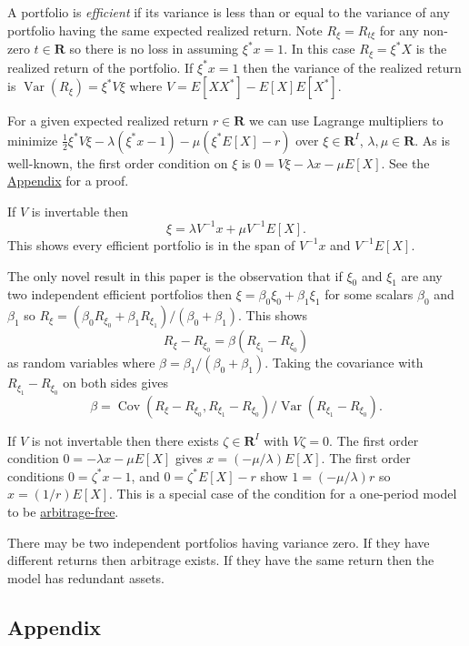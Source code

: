 A portfolio is \emph{efficient} if its variance is less than or equal to
the variance of any portfolio having the same expected realized return.
Note \(R_\xi = R_{t\xi}\) for any non-zero \(t\in\mathbf{R}\) so there
is no loss in assuming \(\xi^* x = 1\). In this case \(R_\xi = \xi^* X\)
is the realized return of the portfolio. If \(\xi^* x = 1\) then the
variance of the realized return is
\(\operatorname{Var}(R_\xi) = \xi^*V\xi\) where \({V = E[X X^*] -
E[X] E[X^*]}\).

For a given expected realized return \(r\in\mathbf{R}\) we can use
Lagrange multipliers to minimize
\({\frac{1}{2}\xi^* V\xi - \lambda(\xi^* x - 1) - \mu(\xi^* E[X] - r)}\)
over \(\xi\in\mathbf{R}^I\), \({\lambda, \mu\in\mathbf{R}}\). As is
well-known, the first order condition on \(\xi\) is
\({0 = V\xi - \lambda x - \mu E[X]}\). See the
\hyperref[appendix]{Appendix} for a proof.

If \(V\) is invertable then \[
    \xi =  \lambda V^{-1}x + \mu V^{-1} E[X].
\] This shows every efficient portfolio is in the span of \(V^{-1}x\)
and \(V^{-1} E[X]\).

The only novel result in this paper is the observation that if \(\xi_0\)
and \(\xi_1\) are any two independent efficient portfolios then
\({\xi = \beta_0\xi_0 + \beta_1\xi_1}\) for some scalars \(\beta_0\) and
\(\beta_1\) so
\({R_\xi = (\beta_0 R_{\xi_0} + \beta_1 R_{\xi_1})/(\beta_0 + \beta_1)}\).
This shows \[
    R_\xi - R_{\xi_0} = \beta(R_{\xi_1} - R_{\xi_0})
\] as random variables where \(\beta = \beta_1/(\beta_0 + \beta_1)\).
Taking the covariance with \({R_{\xi_1} - R_{\xi_0}}\) on both sides
gives \[
    \beta = \operatorname{Cov}(R_\xi - R_{\xi_0}, R_{\xi_1} - R_{\xi_0})/\operatorname{Var}(R_{\xi_1} - R_{\xi_0}).
\]

If \(V\) is not invertable then there exists \(\zeta\in\mathbf{R}^I\)
with \({V\zeta = 0}\). The first order condition
\({0 = -\lambda x - \mu E[X]}\) gives \(x = (-\mu/\lambda)E[X]\). The
first order conditions \({0 = \zeta^*x - 1}\), and
\({0 = \zeta^*E[X] - r}\) show \({1 = (-\mu/\lambda)r}\) so
\({x = (1/r)E[X]}\). This is a special case of the condition for a
one-period model to be \hyperref[ftap]{arbitrage-free}.

There may be two independent portfolios having variance zero. If they
have different returns then arbitrage exists. If they have the same
return then the model has redundant assets.

\subsection{Appendix}\label{appendix}

